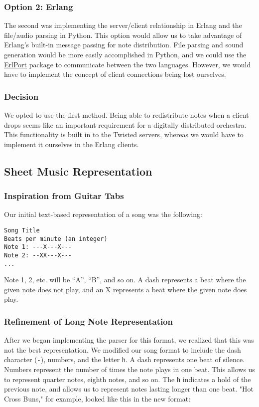 \documentclass[12pt, letterpaper]{article}
\begin{document}
\subsubsection{Option 2: Erlang}
The second was implementing the server/client relationship in Erlang and the file/audio parsing in Python. This option would allow us to take advantage of Erlang’s built-in message passing for note distribution. File parsing and sound generation would be more easily accomplished in Python, and we could use the \href{http://erlport.org/docs/python.html}{ErlPort} package to communicate between the two languages. However, we would have to implement the concept of client connections being lost ourselves.
            
\subsubsection{Decision}
We opted to use the first method. Being able to redistribute notes when a client drops seems like an important requirement for a digitally distributed orchestra. This functionality is built in to the Twisted servers, whereas we would have to implement it ourselves in the Erlang clients.

\subsection{Sheet Music Representation}
        
\subsubsection{Inspiration from Guitar Tabs}
Our initial text-based representation of a song was the following:
            
\begin{verbatim}
Song Title
Beats per minute (an integer)
Note 1: ---X---X---
Note 2: --XX---X---
...
\end{verbatim}
            
Note 1, 2, etc. will be “A”, “B”, and so on. A dash represents a beat where the given note does not play, and an X represents a beat where the given note does play.
            
\subsubsection{Refinement of Long Note Representation}
After we began implementing the parser for this format, we realized that this was not the best representation. We modified our song format to include the dash character (\texttt{-}), numbers, and the letter \texttt{h}. A dash represents one beat of silence. Numbers represent the number of times the note plays in one beat. This allows us to represent quarter notes, eighth notes, and so on. The \texttt{h} indicates a hold of the previous note, and allows us to represent notes lasting longer than one beat. "Hot Cross Buns," for example, looked like this in the new format:
            
\end{document}
